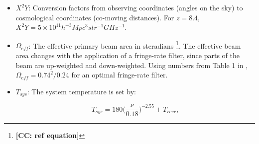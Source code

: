 \documentclass[preprint2,numberedappendix,tighten]{aastex6}  %
\newcommand{\cc}[1]{{\color{purple} \textbf{[CC: #1]}}}
\begin{document}
\begin{itemize}
\item $X^{2}Y$: Conversion factors from observing coordinates (angles on the sky) to cosmological coordinates (co-moving distances). For $z=8.4$, $X^{2}Y = 5 \times 10^{11} h^{-3} Mpc^{3} str^{-1} GHz^{-1}$.
\item $\Omega_{eff}$: The effective primary beam area in steradians \footnote{\cc{ref equation}}. The effective beam area changes with the application of a fringe-rate filter, since parts of the beam are up-weighted and down-weighted. Using numbers from Table 1 in \citet{parsons_et_al2016}, $\Omega_{eff} = 0.74^{2}/0.24$ for an optimal fringe-rate filter. 
\item $T_{sys}$: The system temperature is set by:

\begin{equation}
\label{eq:sys}
T_{sys} = 180\Big(\frac{\nu}{0.18}\Big)^{-2.55} + T_{rcvr},
\end{equation}


\end{itemize}
\end{document}
